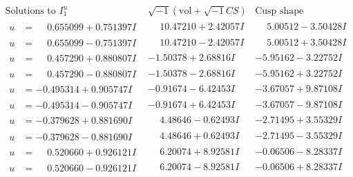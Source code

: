 \documentclass[1p]{elsarticle_modified}
\theoremstyle{definition}
\newcommand{\I}{\sqrt{-1}}
\begin{document}
$$\begin{array}{c|c|c}  
\text{Solutions to }I^u_{1}& \I (\text{vol} + \sqrt{-1}CS) & \text{Cusp shape}\\
 \hline 
\begin{aligned}
u &= \phantom{-}0.655099 + 0.751397 I\end{aligned}
 & \phantom{-}10.47210 + 2.42057 I & \phantom{-}5.00512 - 3.50428 I \\ \hline\begin{aligned}
u &= \phantom{-}0.655099 - 0.751397 I\end{aligned}
 & \phantom{-}10.47210 - 2.42057 I & \phantom{-}5.00512 + 3.50428 I \\ \hline\begin{aligned}
u &= \phantom{-}0.457290 + 0.880807 I\end{aligned}
 & -1.50378 + 2.68816 I & -5.95162 - 3.22752 I \\ \hline\begin{aligned}
u &= \phantom{-}0.457290 - 0.880807 I\end{aligned}
 & -1.50378 - 2.68816 I & -5.95162 + 3.22752 I \\ \hline\begin{aligned}
u &= -0.495314 + 0.905747 I\end{aligned}
 & -0.91674 - 6.42453 I & -3.67057 + 9.87108 I \\ \hline\begin{aligned}
u &= -0.495314 - 0.905747 I\end{aligned}
 & -0.91674 + 6.42453 I & -3.67057 - 9.87108 I \\ \hline\begin{aligned}
u &= -0.379628 + 0.881690 I\end{aligned}
 & \phantom{-}4.48646 - 0.62493 I & -2.71495 + 3.55329 I \\ \hline\begin{aligned}
u &= -0.379628 - 0.881690 I\end{aligned}
 & \phantom{-}4.48646 + 0.62493 I & -2.71495 - 3.55329 I \\ \hline\begin{aligned}
u &= \phantom{-}0.520660 + 0.926121 I\end{aligned}
 & \phantom{-}6.20074 + 8.92581 I & -0.06506 - 8.28337 I \\ \hline\begin{aligned}
u &= \phantom{-}0.520660 - 0.926121 I\end{aligned}
 & \phantom{-}6.20074 - 8.92581 I & -0.06506 + 8.28337 I \\ \hline\begin{aligned}

\end{aligned}
\end{array}$$
\end{document}
